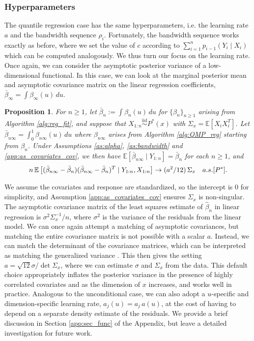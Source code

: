 \documentclass[11pt,a4paper]{article}
\newtheorem{proposition}{Proposition}%
\newcommand{\iid}{\overset{\mathrm{iid}}{\sim}}
\newcommand{\E}{\mathbb{E}}
\begin{document}
\subsubsection{Hyperparameters}
The quantile regression case has the same hyperparameters, i.e. the learning rate $a$ and the bandwidth sequence $\rho_i$. Fortunately, the bandwidth sequence works exactly as before, where we set the value of $c$ according to $\sum_{i = 1}^n p_{i-1}(Y_i \mid X_i)$ which can be computed analogously. We thus turn our focus on the learning rate. Once again, we can consider the asymptotic posterior variance of a low-dimensional functional. In this case,  we can look at the marginal posterior mean and asymptotic covariance matrix on the linear regression coefficients, $\bar{\beta}_\infty = \int \beta_\infty(u) \, du$.
\begin{proposition}\label{prop:QR_coverage}
For $n \geq 1$, let $\bar{\beta}_n:= \int \beta_n(u) \, du$ for $\{\beta_n\}_{n \geq 1}$ arising from {Algorithm \ref{alg:reg_fit}}, and suppose that $X_{1:n} \iid P^*(x)$ with $\Sigma_x = \E[X_i X_i^T]$. Let $\bar{\beta}_{n\infty} = \int_0^1 \beta_{n\infty}(u)\, du$
 where $\beta_{n\infty}$ arises from {Algorithm \ref{alg:QMP_reg}} starting from $\beta_n$.
Under {Assumptions \ref{as:alpha}}, {\ref{as:bandwidth}} and {\ref{app:as_covariates_cov}}, we then have
$\E\left[\bar{\beta}_{n\infty} \mid Y_{1:n}\right] = \bar{\beta}_n$ for each $n \geq 1$, and 
$${n}\, \E\left[(\bar{\beta}_{n\infty} - \bar{\beta}_n)(\bar{\beta}_{n\infty} - \bar{\beta}_n)^T \mid Y_{1:n},X_{1:n}\right] \to (a^2/12)\, \Sigma_x \quad \textnormal{a.s.}[P^*].$$
\end{proposition}\vspace{-1mm}
We assume the covariates and response are standardized, so the intercept is 0 for simplicity, and {Assumption \ref{app:as_covariates_cov}} ensures $\Sigma_x$ is non-singular. The asymptotic covariance matrix of the least squares estimate of $\hat{\beta}_n$ in linear regression is $\sigma^2 \Sigma_x^{-1}/n$, where $\sigma^2$ is the variance of the residuals from the linear model. We can once again attempt a matching of asymptotic covariances, but matching the entire covariance matrix is not possible with a scalar $a$. Instead, we can match the determinant of the covariance matrices, which can be interpreted as matching the generalized variance \citep{Wilks1932}. This then gives the setting 
$a = {\sqrt{12} \sigma}/{\det \Sigma_x}$,
where we can estimate $\sigma$ and $\Sigma_x$ from the data. 
This default choice appropriately inflates the posterior variance in the presence of highly correlated covariates and as the dimension of $x$ increases, and works well in practice.
Analogous to the unconditional case, we can also adopt a $u$-specific and dimension-specific learning rate, $a_j(u) =a_j \, a(u) $, at the cost of having to depend on a separate density estimate of the residuals. We provide a brief discussion in Section \ref{app:sec_func} of the Appendix, but leave a detailed investigation for future work.
\end{document}
